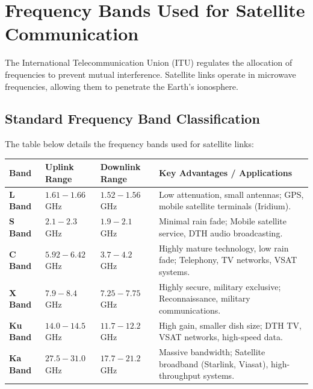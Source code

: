 \documentclass[12pt,a4paper]{article}
\renewcommand{\arraystretch}{1.45}
\begin{document}
\section{Frequency Bands Used for Satellite Communication}

The International Telecommunication Union (ITU) regulates the allocation of frequencies to prevent mutual interference. Satellite links operate in microwave frequencies, allowing them to penetrate the Earth's ionosphere.

\subsection{Standard Frequency Band Classification}
The table below details the frequency bands used for satellite links:

\par\noindent
{\renewcommand{\arraystretch}{1.55}%
\begin{tabularx}{\linewidth}{|B{2.2cm}|>{\centering\arraybackslash}m{2.5cm}|>{\centering\arraybackslash}m{2.5cm}|Y|}\hline
\textbf{Band} & \textbf{Uplink Range} & \textbf{Downlink Range} & \textbf{Key Advantages / Applications} \\[4pt]
\hline
\textbf{L Band} & $1.61 - 1.66$ GHz & $1.52 - 1.56$ GHz & Low attenuation, small antennas; GPS, mobile satellite terminals (Iridium). \\[4pt]
\hline
\textbf{S Band} & $2.1 - 2.3$ GHz & $1.9 - 2.1$ GHz & Minimal rain fade; Mobile satellite service, DTH audio broadcasting. \\[4pt]
\hline
\textbf{C Band} & $5.92 - 6.42$ GHz & $3.7 - 4.2$ GHz & Highly mature technology, low rain fade; Telephony, TV networks, VSAT systems. \\[4pt]
\hline
\textbf{X Band} & $7.9 - 8.4$ GHz & $7.25 - 7.75$ GHz & Highly secure, military exclusive; Reconnaissance, military communications. \\[4pt]
\hline
\textbf{Ku Band} & $14.0 - 14.5$ GHz & $11.7 - 12.2$ GHz & High gain, smaller dish size; DTH TV, VSAT networks, high-speed data. \\[4pt]
\hline
\textbf{Ka Band} & $27.5 - 31.0$ GHz & $17.7 - 21.2$ GHz & Massive bandwidth; Satellite broadband (Starlink, Viasat), high-throughput systems. \\[4pt]
\hline
\end{tabularx}
}
\end{document}
